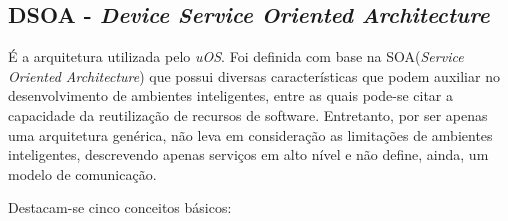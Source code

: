 \subsection{DSOA - \emph{Device Service Oriented Architecture}}

É a arquitetura utilizada pelo \emph{uOS}. Foi definida com base na SOA(\emph{Service Oriented Architecture}) que possui diversas características que podem auxiliar no desenvolvimento de ambientes inteligentes, entre as quais pode-se citar a capacidade da reutilização de recursos de software. Entretanto, por ser apenas uma arquitetura genérica, não leva em consideração as limitações de ambientes inteligentes, descrevendo apenas serviços em alto nível e não define, ainda, um modelo de comunicação.

Destacam-se cinco conceitos básicos:


